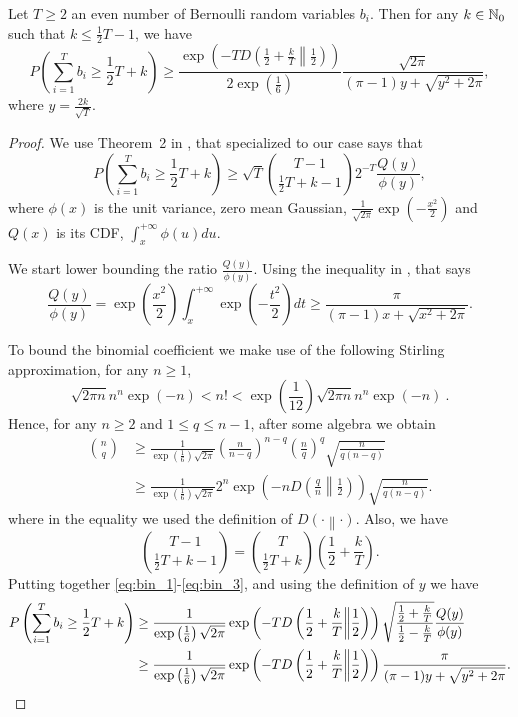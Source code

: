 \begin{theorem}
\label{lemma:bin}
Let $T\geq2$ an even number of Bernoulli random variables $b_i$. Then for any $k \in \mathbb{N}_0$ such that $k\leq \frac{1}{2}T-1$, we have
\[
P\left( \sum_{i=1}^T b_i \geq \frac{1}{2} T + k\right) 
\geq  \frac{\exp\left(-T D\left(\frac{1}{2}+\frac{k}{T}\middle\|\frac{1}{2}\right)\right)}{2 \exp\left(\frac{1}{6}\right)} \frac{\sqrt{2 \pi}}{(\pi-1)y+\sqrt{y^2+2 \pi}},
\]
where $y=\frac{2 k}{\sqrt{T}}$.
\end{theorem}
\begin{proof}
We use Theorem~2 in \cite{McKay1989}, that specialized to our case says that
\begin{equation}
\label{eq:bin_1}
P\left( \sum_{i=1}^T b_i \geq  \frac{1}{2} T + k  \right) 
\geq \sqrt{T} \binom{T-1}{ \frac{1}{2} T + k -1} 2^{-T} \frac{Q(y)}{\phi(y)},
\end{equation}
where $\phi(x)$ is the unit variance, zero mean Gaussian, $\frac{1}{\sqrt{2 \pi}} \exp(-\frac{x^2}{2})$ and $Q(x)$ is its CDF, $\int_{x}^{+\infty} \phi(u) du$.

We start lower bounding the ratio $\frac{Q(y)}{\phi(y)}$. Using the inequality in \cite{Boyd59}, that says
\[
\frac{Q(y)}{\phi(y)} 
= \exp\left(\frac{x^2}{2}\right) \int_{x}^{+\infty} \exp\left(-\frac{t^2}{2}\right) dt
\geq \frac{\pi}{(\pi-1)x+\sqrt{x^2+2 \pi}}.
\]

To bound the binomial coefficient we make use of the following Stirling approximation, for any $n\geq 1$,
\[
\sqrt{2 \pi n} n^n \exp(-n) < n! < \exp\left(\frac{1}{12}\right)\sqrt{2 \pi n} n^n \exp(-n)~.
\]
Hence, for any $n \geq 2$ and $1\leq q \leq n-1$, after some algebra we obtain
\begin{align*}
{n \choose q} 
&\geq \frac{1}{\exp\left(\frac{1}{6}\right) \sqrt{2 \pi}} \left(\frac{n}{n-q}\right)^{n-q} \left(\frac{n}{q}\right)^{q} \sqrt{\frac{n}{q(n-q)}} \\
&\geq \frac{1}{\exp\left(\frac{1}{6}\right) \sqrt{2 \pi}} 2^n \exp\left(-n D\left(\frac{q}{n}\middle\|\frac{1}{2}\right)\right) \sqrt{\frac{n}{q(n-q)}}.
\end{align*}
where in the equality we used the definition of $D\left(\cdot\middle\|\cdot\right)$.
Also, we have
\begin{equation}
\label{eq:bin_3}
{T-1 \choose \frac{1}{2} T + k - 1} = {T \choose \frac{1}{2} T + k} \left(\frac{1}{2} + \frac{k}{T}\right) .
\end{equation}
Putting together \eqref{eq:bin_1}-\eqref{eq:bin_3}, and using the definition of $y$ we have
\begin{align*}
P\left( \sum_{i=1}^T b_i \geq \frac{1}{2} T + k \right) 
&\geq \frac{1}{\exp\left(\frac{1}{6}\right) \sqrt{2 \pi}} \exp\left(-T D\left(\frac{1}{2}+\frac{k}{T}\middle\|\frac{1}{2}\right)\right) \sqrt{\frac{\frac{1}{2} + \frac{k}{T}}{\frac{1}{2}-\frac{k}{T}}}  \frac{Q(y)}{\phi(y)} \\
&\geq \frac{1}{\exp\left(\frac{1}{6}\right) \sqrt{2 \pi}} \exp\left(-T D\left(\frac{1}{2}+\frac{k}{T}\middle\|\frac{1}{2}\right)\right) \frac{\pi}{(\pi-1)y+\sqrt{y^2+2 \pi}}. \qedhere
\end{align*}
\end{proof}


